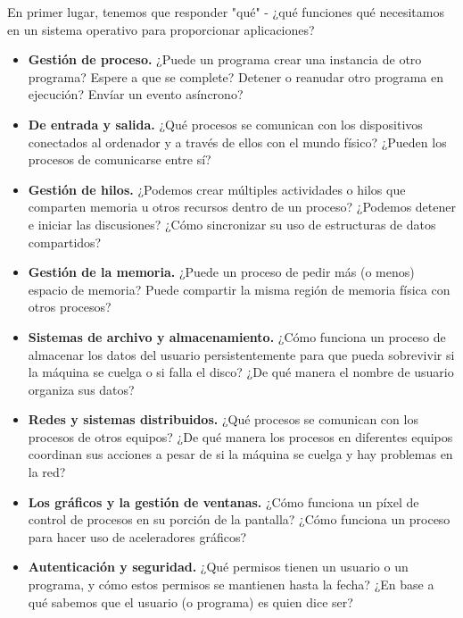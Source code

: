 \documentclass[10pt]{book}
\begin{document}
En primer lugar, tenemos que responder "qué" - ¿qué funciones qué necesitamos en un sistema operativo para proporcionar aplicaciones?
\begin{itemize}
\item \textbf{Gestión de proceso.} ¿Puede un programa crear una instancia de otro programa? Espere a que se complete? Detener o reanudar otro programa en ejecución? Envíar un evento asíncrono?

\item \textbf{De entrada y salida.} ¿Qué procesos se comunican con los dispositivos conectados al ordenador y a través de ellos con el mundo físico? ¿Pueden los procesos de comunicarse entre sí?

\item \textbf{Gestión de hilos.} ¿Podemos crear múltiples actividades o hilos que comparten memoria u otros recursos dentro de un proceso? ¿Podemos detener e iniciar las discusiones? ¿Cómo sincronizar su uso de estructuras de datos compartidos?

\item \textbf{Gestión de la memoria.} ¿Puede un proceso de pedir más (o menos) espacio de memoria? Puede compartir la misma región de memoria física con otros procesos?

\item \textbf{Sistemas de archivo y almacenamiento.} ¿Cómo funciona un proceso de almacenar los datos del usuario persistentemente para que pueda sobrevivir si la máquina se cuelga o si falla el disco? ¿De qué manera el nombre de usuario organiza sus datos?

\item \textbf{Redes y sistemas distribuidos.} ¿Qué procesos se comunican con los procesos de otros equipos? ¿De qué manera los procesos en diferentes equipos coordinan sus acciones a pesar de si la máquina se cuelga y hay problemas en la red?

\item \textbf{Los gráficos y la gestión de ventanas.} ¿Cómo funciona un píxel de control de procesos en su porción de la pantalla? ¿Cómo funciona un proceso para hacer uso de aceleradores gráficos?

\item \textbf{Autenticación y seguridad.} ¿Qué permisos tienen un usuario o un programa, y cómo estos permisos se mantienen hasta la fecha? ¿En base a qué sabemos que el usuario (o programa) es quien dice ser?
\end{itemize}
\end{document}
